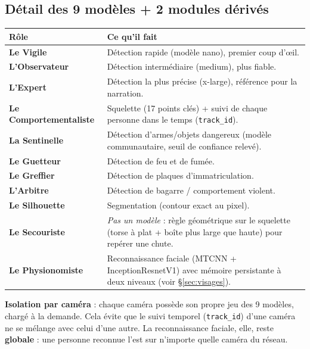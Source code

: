 \documentclass[11pt,a4paper]{article}
\begin{document}
\subsection*{D\'etail des 9 mod\`eles + 2 modules d\'eriv\'es}

\begin{center}
\renewcommand{\arraystretch}{1.3}
\begin{tabularx}{\linewidth}{@{}lX@{}}
\hline
\textbf{R\^ole} & \textbf{Ce qu'il fait} \\
\hline
\textbf{Le Vigile} & D\'etection rapide (mod\`ele nano), premier coup d'\oe il. \\
\textbf{L'Observateur} & D\'etection interm\'ediaire (medium), plus fiable. \\
\textbf{L'Expert} & D\'etection la plus pr\'ecise (x-large), r\'ef\'erence pour la narration. \\
\textbf{Le Comportementaliste} & Squelette (17 points cl\'es) + suivi de chaque personne dans le temps (\texttt{track\_id}). \\
\textbf{La Sentinelle} & D\'etection d'armes/objets dangereux (mod\`ele communautaire, seuil de confiance relev\'e). \\
\textbf{Le Guetteur} & D\'etection de feu et de fum\'ee. \\
\textbf{Le Greffier} & D\'etection de plaques d'immatriculation. \\
\textbf{L'Arbitre} & D\'etection de bagarre / comportement violent. \\
\textbf{Le Silhouette} & Segmentation (contour exact au pixel). \\
\textbf{Le Secouriste} & \emph{Pas un mod\`ele} : r\`egle g\'eom\'etrique sur le squelette (torse \`a plat + bo\^ite
plus large que haute) pour rep\'erer une chute. \\
\textbf{Le Physionomiste} & Reconnaissance faciale (MTCNN + InceptionResnetV1) avec m\'emoire persistante \`a deux
niveaux (voir \S\ref{sec:visages}). \\
\hline
\end{tabularx}
\end{center}

\begin{notecard}
\textbf{Isolation par cam\'era} : chaque cam\'era poss\`ede son propre jeu des 9 mod\`eles, charg\'e \`a la
demande. Cela \'evite que le suivi temporel (\texttt{track\_id}) d'une cam\'era ne se m\'elange avec celui
d'une autre. La reconnaissance faciale, elle, reste \textbf{globale} : une personne reconnue l'est sur
n'importe quelle cam\'era du r\'eseau.
\end{notecard}
\end{document}
